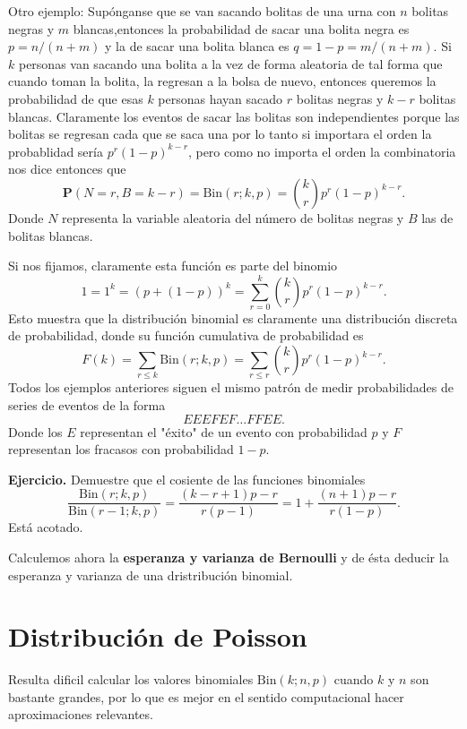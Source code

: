 \documentclass[letterpaper]{book}
\newcommand{\prob}{\textbf{P}}
\newcommand{\eje}{{\newline \noindent \sc \textbf{Ejercicio. }}}
\begin{document}
Otro ejemplo: Supónganse que se van sacando bolitas de una urna con \(n\) bolitas negras y \(m\) blancas,entonces la probabilidad de sacar una bolita negra es \(p=n/(n+m)\) y la de sacar una bolita blanca es \(q=1-p=m/(n+m)\). Si \(k\) personas van sacando una bolita a la vez de forma aleatoria de tal forma que cuando toman la bolita, la regresan a la bolsa de nuevo, entonces queremos la probabilidad de que esas \(k\) personas hayan sacado \(r\) bolitas negras y \(k-r\) bolitas blancas.
Claramente los eventos de sacar las bolitas son independientes porque las bolitas se regresan cada que se saca una por lo tanto si importara el orden la probablidad sería \(p^r(1-p)^{k-r}\), pero como no importa el orden la combinatoria nos dice entonces que
\[
\prob(N=r,B=k-r)=\mathrm{Bin}(r;k,p)={k\choose r}p^r(1-p)^{k-r}.
\]
\noindent Donde \(N\) representa la variable aleatoria del número de bolitas negras y \(B\) las de bolitas blancas. 

Si nos fijamos, claramente esta función es parte del binomio
\[
1=1^k=(p+(1-p))^k=\sum_{r=0}^k{k\choose r}p^r(1-p)^{k-r}.
\]
\noindent Esto muestra que la distribución binomial es claramente una distribución discreta de probabilidad, donde su función cumulativa de probabilidad es
\[
F(k)=\sum_{r\leq k}\mathrm{Bin}(r;k,p)=\sum_{r\leq r}{k\choose r}p^r(1-p)^{k-r}.
\]
Todos los ejemplos anteriores siguen el mismo patrón de medir probabilidades de series de eventos de la forma
\[
EEEFEF\dots FFEE.
\]
\noindent Donde los \(E\) representan el "éxito" de un evento con probabilidad \(p\) y \(F\) representan los fracasos con probabilidad \(1-p\).

\eje Demuestre que el cosiente de las funciones binomiales
\[
\frac{\mathrm{Bin}(r;k,p)}{\mathrm{Bin}(r-1;k,p)}=\frac{(k-r+1)p-r}{r(p-1)}=1+\frac{(n+1)p-r}{r(1-p)}.
\]
\noindent Está acotado.

Calculemos ahora la \textbf{esperanza y varianza de Bernoulli} y de ésta deducir la esperanza y varianza de una dristribución binomial.

\section{Distribución de Poisson}
\label{sec:org8c9715a}
Resulta dificil calcular los valores binomiales \(\textrm{Bin}(k;n,p)\) cuando \(k\) y \(n\) son bastante grandes, por lo que es mejor en el sentido computacional hacer aproximaciones relevantes.
\end{document}
